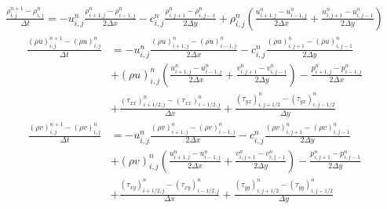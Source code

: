 \documentclass{article}
\begin{document}
\begin{equation}
  \begin{aligned}
    \frac{\rho^{n+1}_{i,j} - \rho^{n}_{i,j}}{\Delta t} = - u^{n}_{i,j} \frac{\rho^{n}_{i+1,j}-\rho^{n}_{i-1,j}}{2\Delta x} - c^{n}_{i,j} \frac{\rho^{n}_{i,j+1}-\rho^{n}_{i,j-1}}{2\Delta y} + \rho^{n}_{i,j} \left(\frac{u^{n}_{i+1,j}-u^{n}_{i-1,j}}{2\Delta x} + \frac{u^{n}_{i,j+1}-u^{n}_{i,j-1}}{2\Delta y}\right)
  \end{aligned}
\end{equation}
\begin{equation}
  \begin{aligned}
    \frac{(\rho u)^{n+1}_{i,j} - (\rho u)^{n}_{i,j}}{\Delta t} &= - u^{n}_{i,j} \frac{(\rho u)^{n}_{i+1,j}-(\rho u)^{n}_{i-1,j}}{2\Delta x} - c^{n}_{i,j} \frac{(\rho u)^{n}_{i,j+1}-(\rho u)^{n}_{i,j-1}}{2\Delta y} \\
    &+ (\rho u)^{n}_{i,j} \left(\frac{u^{n}_{i+1,j}-u^{n}_{i-1,j}}{2\Delta x} + \frac{v^{n}_{i,j+1}-v^{n}_{i,j-1}}{2\Delta y}\right) - \frac{p^{n}_{i+1,j} - p^{n}_{i-1,j}}{2\Delta x} \\
    &+ \frac{(\tau_{xx})^{n}_{i+1/2,j} - (\tau_{xx})^{n}_{i-1/2,j}}{\Delta x} + \frac{(\tau_{yx})^{n}_{i,j+1/2} - (\tau_{yx})^{n}_{i,j-1/2}}{\Delta y}
  \end{aligned}
\end{equation}
\begin{equation}
  \begin{aligned}
    \frac{(\rho v)^{n+1}_{i,j} - (\rho v)^{n}_{i,j}}{\Delta t} &= - u^{n}_{i,j} \frac{(\rho v)^{n}_{i+1,j}-(\rho v)^{n}_{i-1,j}}{2\Delta x} - c^{n}_{i,j} \frac{(\rho v)^{n}_{i,j+1}-(\rho v)^{n}_{i,j-1}}{2\Delta y} \\
    &+ (\rho v)^{n}_{i,j} \left(\frac{u^{n}_{i+1,j}-u^{n}_{i-1,j}}{2\Delta x} + \frac{v^{n}_{i,j+1}-v^{n}_{i,j-1}}{2\Delta y}\right) - \frac{p^{n}_{i,j+1} - p^{n}_{i,j-1}}{2\Delta y} \\
    &+ \frac{(\tau_{xy})^{n}_{i+1/2,j} - (\tau_{xy})^{n}_{i-1/2,j}}{\Delta x} + \frac{(\tau_{yy})^{n}_{i,j+1/2} - (\tau_{yy})^{n}_{i,j-1/2}}{\Delta y}
  \end{aligned}
\end{equation}
\end{document}
